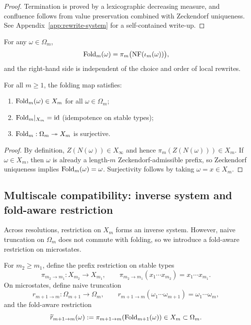 \begin{proof}
Termination is proved by a lexicographic decreasing measure, and confluence follows from value preservation combined with Zeckendorf uniqueness. See Appendix~\ref{app:rewrite-system} for a self-contained write-up.
\end{proof}

\begin{corollary}\label{cor:fold-order-independent}
For any $\omega\in\Omega_m$,
\[
\mathrm{Fold}_m(\omega)=\pi_m\bigl(\mathrm{NF}(\iota_m(\omega))\bigr),
\]
and the right-hand side is independent of the choice and order of local rewrites.
\end{corollary}

\begin{proposition}\label{prop:fold-idem-surj}
For all $m\ge 1$, the folding map satisfies:
\begin{enumerate}
  \item $\mathrm{Fold}_m(\omega)\in X_m$ for all $\omega\in\Omega_m$;
  \item $\mathrm{Fold}_m|_{X_m}=\mathrm{id}$ (idempotence on stable types);
  \item $\mathrm{Fold}_m:\Omega_m\twoheadrightarrow X_m$ is surjective.
\end{enumerate}
\end{proposition}

\begin{proof}
By definition, $Z(N(\omega))\in X_\infty$ and hence $\pi_m(Z(N(\omega)))\in X_m$.
If $\omega\in X_m$, then $\omega$ is already a length-$m$ Zeckendorf-admissible prefix, so Zeckendorf uniqueness implies $\mathrm{Fold}_m(\omega)=\omega$.
Surjectivity follows by taking $\omega=x\in X_m$.
\end{proof}

\subsection{Multiscale compatibility: inverse system and fold-aware restriction}\label{subsec:fold-multiscale}
Across resolutions, restriction on $X_m$ forms an inverse system.
However, naive truncation on $\Omega_m$ does not commute with folding, so we introduce a fold-aware restriction on microstates.

\begin{definition}\label{def:fold-restriction}
For $m_2\ge m_1$, define the prefix restriction on stable types
\[
\pi_{m_2\to m_1}:X_{m_2}\to X_{m_1},\qquad \pi_{m_2\to m_1}(x_1\cdots x_{m_2})=x_1\cdots x_{m_1}.
\]
On microstates, define naive truncation
\[
r_{m+1\to m}:\Omega_{m+1}\to\Omega_m,\qquad r_{m+1\to m}(\omega_1\cdots\omega_{m+1})=\omega_1\cdots\omega_m,
\]
and the fold-aware restriction
\[
\widetilde r_{m+1\to m}(\omega):=\pi_{m+1\to m}(\mathrm{Fold}_{m+1}(\omega))\in X_m\subset\Omega_m.
\]
\end{definition}

